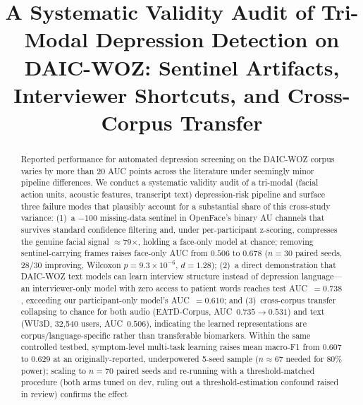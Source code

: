 \documentclass[5p,twocolumn]{elsarticle}
\begin{document}
\begin{frontmatter}

\title{A Systematic Validity Audit of Tri-Modal Depression Detection on
DAIC-WOZ: Sentinel Artifacts, Interviewer Shortcuts, and Cross-Corpus
Transfer}

\author{}

\address{Department of Computer Science and Engineering,
Netrokona University, Netrokona 2400, Bangladesh \\
Dataset: DAIC-WOZ provided by the University of Southern California
Institute for Creative Technologies.
Code: \url{https://github.com/DevMursLab/Thesis}
(DOI: \url{https://doi.org/10.5281/zenodo.22806159}).}

\begin{abstract}
Reported performance for automated depression screening on the
DAIC-WOZ corpus varies by more than 20 AUC points across the
literature under seemingly minor pipeline differences. We conduct a
systematic validity audit of a tri-modal (facial action units,
acoustic features, transcript text) depression-risk pipeline and
surface three failure modes that plausibly account for a substantial
share of this cross-study variance: (1)~a $-100$ missing-data
sentinel in OpenFace's binary AU channels that survives standard
confidence filtering and, under per-participant z-scoring, compresses
the genuine facial signal $\approx$79$\times$, holding a face-only
model at chance; removing sentinel-carrying frames raises face-only
AUC from $0.506$ to $0.678$ ($n{=}30$ paired seeds, 28/30 improving,
Wilcoxon $p{=}9.3{\times}10^{-6}$, $d{=}1.28$); (2)~a direct
demonstration that DAIC-WOZ text models can learn interview structure
instead of depression language---an interviewer-only model with zero
access to patient words reaches test AUC~$=0.738$, exceeding our
participant-only model's AUC~$=0.610$; and (3)~cross-corpus transfer
collapsing to chance for both audio (EATD-Corpus, AUC~$0.735\to0.531$)
and text (WU3D, 32,540 users, AUC~$0.506$), indicating the learned
representations are corpus/language-specific rather than transferable
biomarkers. Within the same controlled testbed, symptom-level
multi-task learning raises mean macro-F1 from $0.607$ to $0.629$ at
an originally-reported, underpowered 5-seed sample ($n{\approx}67$
needed for 80\% power); scaling to $n{=}70$ paired seeds and re-running
with a threshold-matched procedure (both arms tuned on dev, ruling out
a threshold-estimation confound raised in review) confirms the effect

\end{abstract}
\end{frontmatter}
\end{document}
